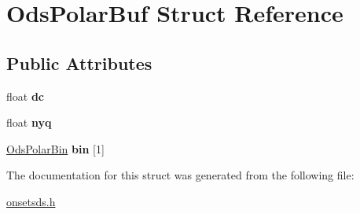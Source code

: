 \hypertarget{structOdsPolarBuf}{\section{\-Ods\-Polar\-Buf \-Struct \-Reference}
\label{structOdsPolarBuf}
}
\subsection*{\-Public \-Attributes}
\begin{DoxyCompactItemize}
\item 
\hypertarget{structOdsPolarBuf_a639280a14db7e9647673f976cf7a4490}{float {\bfseries dc}}\label{structOdsPolarBuf_a639280a14db7e9647673f976cf7a4490}

\item 
\hypertarget{structOdsPolarBuf_a85285987a7986a54655b36ff3f996276}{float {\bfseries nyq}}\label{structOdsPolarBuf_a85285987a7986a54655b36ff3f996276}

\item 
\hypertarget{structOdsPolarBuf_a7cc11918dac85a3bf5fe9a4c8482a912}{\hyperlink{structOdsPolarBin}{\-Ods\-Polar\-Bin} {\bfseries bin} \mbox{[}1\mbox{]}}\label{structOdsPolarBuf_a7cc11918dac85a3bf5fe9a4c8482a912}

\end{DoxyCompactItemize}


\-The documentation for this struct was generated from the following file\-:\begin{DoxyCompactItemize}
\item 
\hyperlink{onsetsds_8h}{onsetsds.\-h}\end{DoxyCompactItemize}
